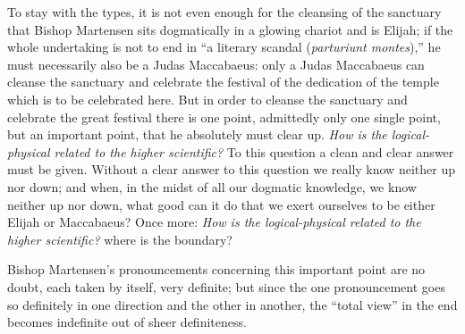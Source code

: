 \documentclass[12pt]{book}
\begin{document}
To stay with the types, it is not even enough for the cleansing of the sanctuary that Bishop Martensen sits dogmatically in a glowing chariot and is Elijah; if the whole undertaking is not to end in ``a literary scandal (\textit{parturiunt montes}),'' he must necessarily also be a Judas Maccabaeus: only a Judas Maccabaeus can cleanse the sanctuary and celebrate the festival of the dedication of the temple which is to be celebrated here. But in order to cleanse the sanctuary and celebrate the great festival there is one point, admittedly only one single point, but an important point, that he absolutely must clear up. \emph{How is the logical-physical related to the higher scientific?} To this question a clean and clear answer must be given. Without a clear answer to this question we really know neither up nor down; and when, in the midst of all our dogmatic knowledge, we know neither up nor down, what good can it do that we exert ourselves to be either Elijah or Maccabaeus? Once more: \emph{How is the logical-physical related to the higher scientific?} where is the boundary?

Bishop Martensen's pronouncements concerning this important point are no doubt, each taken by itself, very definite; but since the one pronouncement goes so definitely in one direction and the other in another, the ``total view'' in the end becomes indefinite out of sheer definiteness.
\end{document}

